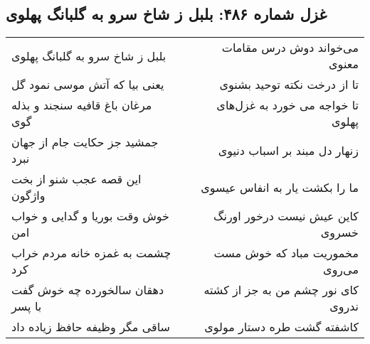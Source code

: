 \begin{center}
\section*{غزل شماره ۴۸۶: بلبل ز شاخ سرو به گلبانگ پهلوی}
\label{sec:sh486}
\begin{longtable}{l p{0.5cm} r}
بلبل ز شاخ سرو به گلبانگ پهلوی
&&
می‌خواند دوش درس مقامات معنوی
\\
یعنی بیا که آتش موسی نمود گل
&&
تا از درخت نکته توحید بشنوی
\\
مرغان باغ قافیه سنجند و بذله گوی
&&
تا خواجه می خورد به غزل‌های پهلوی
\\
جمشید جز حکایت جام از جهان نبرد
&&
زنهار دل مبند بر اسباب دنیوی
\\
این قصه عجب شنو از بخت واژگون
&&
ما را بکشت یار به انفاس عیسوی
\\
خوش وقت بوریا و گدایی و خواب امن
&&
کاین عیش نیست درخور اورنگ خسروی
\\
چشمت به غمزه خانه مردم خراب کرد
&&
مخموریت مباد که خوش مست می‌روی
\\
دهقان سالخورده چه خوش گفت با پسر
&&
کای نور چشم من به جز از کشته ندروی
\\
ساقی مگر وظیفه حافظ زیاده داد
&&
کاشفته گشت طره دستار مولوی
\\
\end{longtable}
\end{center}
